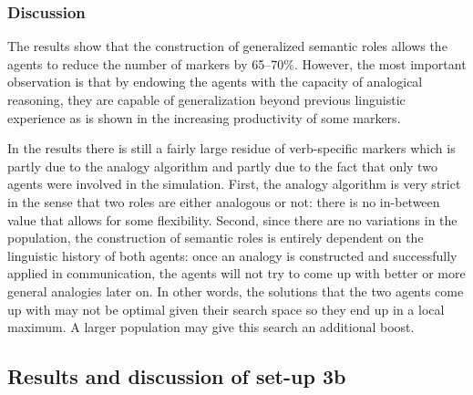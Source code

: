 \subsubsection{Discussion}
 The results show that the construction of generalized semantic roles allows the agents to reduce the number of markers by 65--70\%. However, the most important observation is that by endowing the agents with the capacity of analogical reasoning, they are capable of generalization beyond previous linguistic experience as is shown in the increasing productivity of some markers.

In the results there is still a fairly large residue of verb-specific markers which is partly due to the analogy algorithm and partly due to the fact that only two agents were involved in the simulation. First, the analogy algorithm is very strict in the sense that two roles are either analogous or not: there is no in-between value that allows for some flexibility. Second, since there are no variations in the population, the construction of semantic roles is entirely dependent on the linguistic history of both agents: once an analogy is constructed and successfully applied in communication, the agents will not try to come up with better or more general analogies later on. In other words, the solutions that the two agents come up with may not be optimal given their search space so they end up in a local maximum. A larger population may give this search an additional boost.

\subsection{Results and discussion of set-up 3b}

